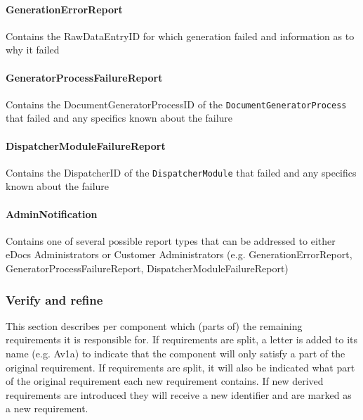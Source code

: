 \documentclass[a4paper,10pt]{article}
\begin{document}
\paragraph{GenerationErrorReport} Contains the RawDataEntryID for which generation failed and information as to why it failed

\paragraph{GeneratorProcessFailureReport} Contains the DocumentGeneratorProcessID of the \texttt{DocumentGeneratorProcess} that failed and any specifics known about the failure

\paragraph{DispatcherModuleFailureReport} Contains the DispatcherID of the \texttt{DispatcherModule} that failed and any specifics known about the failure

\paragraph{AdminNotification} Contains one of several possible report types that can be addressed to either eDocs Administrators or Customer Administrators (e.g. GenerationErrorReport, GeneratorProcessFailureReport, DispatcherModuleFailureReport)

\subsubsection{Verify and refine}
This section describes per component which (parts of) the remaining requirements it is responsible for. If requirements are split, a letter is added to its name (e.g. Av1a) to indicate that the component will only satisfy a part of the original requirement. If requirements are split, it will also be indicated what part of the original requirement each new requirement contains. If new derived requirements are introduced they will receive a new identifier and are marked as a new requirement.
\end{document}
